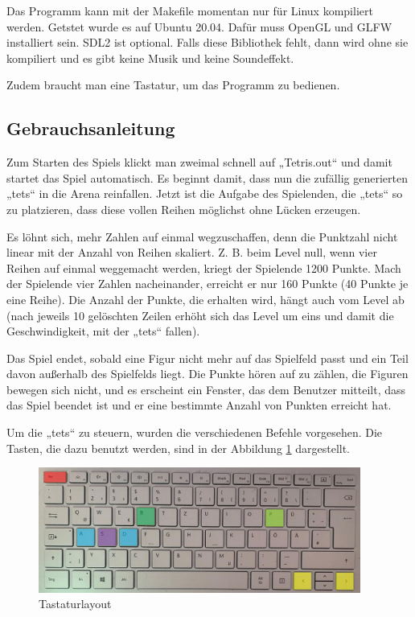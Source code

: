 \documentclass[11pt]{article}
\begin{document}
Das Programm kann mit der Makefile momentan nur für Linux kompiliert werden. Getstet wurde es auf Ubuntu 20.04. 
Dafür muss OpenGL und GLFW installiert sein. SDL2 ist optional. Falls diese Bibliothek fehlt, 
dann wird ohne sie kompiliert und es gibt keine Musik und keine Soundeffekt.

Zudem braucht man eine Tastatur, um das Programm zu bedienen.

\subsection{Gebrauchsanleitung} \label{geb}
Zum Starten des Spiels klickt man zweimal schnell auf „Tetris.out“ und damit startet das Spiel automatisch.  
Es beginnt damit, dass nun die zufällig generierten „\glspl {tet}“ in die Arena reinfallen. Jetzt ist die Aufgabe des Spielenden, die „\glspl {tet}“ so zu platzieren, dass diese vollen Reihen möglichst ohne Lücken erzeugen. 


Es löhnt sich, mehr Zahlen auf einmal wegzuschaffen, denn die Punktzahl nicht linear mit der Anzahl von Reihen skaliert.  Z. B. beim Level null, wenn vier Reihen auf einmal weggemacht werden, kriegt der Spielende 1200 Punkte. Mach der Spielende vier Zahlen nacheinander, erreicht er nur 160 Punkte (40 Punkte je eine Reihe). 
Die Anzahl der Punkte, die erhalten wird, hängt auch vom Level ab (nach jeweils 10 gelöschten Zeilen erhöht sich das Level um eins und damit die Geschwindigkeit, mit der „\glspl {tet}“ fallen).

Das Spiel endet, sobald eine Figur nicht mehr auf das Spielfeld passt und ein Teil davon außerhalb des Spielfelds liegt. Die Punkte hören auf zu zählen, die Figuren bewegen sich nicht, und es erscheint ein Fenster, das dem Benutzer mitteilt, dass das Spiel beendet ist und er eine bestimmte Anzahl von Punkten erreicht hat.

Um die „\glspl {tet}“ zu steuern, wurden die verschiedenen Befehle vorgesehen. Die Tasten, die dazu benutzt werden, sind in der Abbildung \ref{tat} dargestellt.

\begin{figure}[h]
  \centering
  \includegraphics[width=400px]{../images/keyboard.jpg}
  \caption{Tastaturlayout}
  \label{tat}
\end{figure}
\end{document}

